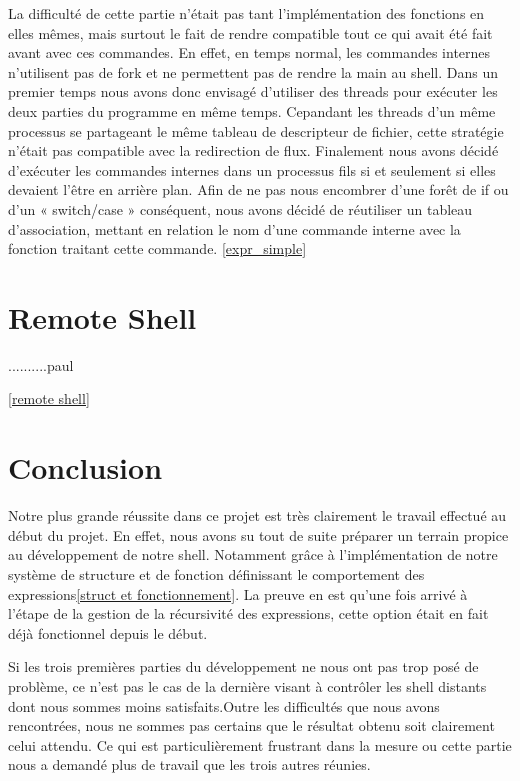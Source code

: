 \documentclass[12pt]{article}
\begin{document}
 La difficulté de cette partie n'était pas tant l'implémentation des fonctions en elles mêmes,
 mais surtout le fait de rendre compatible tout ce qui avait été fait avant avec ces commandes.
 En effet, en temps normal, les commandes internes n'utilisent pas de fork et ne permettent pas
 de rendre la main au shell. Dans un premier temps nous avons donc envisagé d'utiliser des threads
 pour exécuter les deux parties du programme en même temps. Cepandant les threads d'un même processus
 se partageant le même tableau de descripteur de fichier, cette stratégie n'était pas compatible
 avec la redirection de flux. Finalement nous avons décidé d'exécuter les commandes internes dans
 un processus fils si et seulement si elles devaient l'être en arrière plan.
 Afin de ne pas nous encombrer d'une forêt de if ou d'un « switch/case » conséquent, nous avons
 décidé de réutiliser un tableau d'association, mettant en relation le nom d'une commande interne
 avec la fonction traitant cette commande.  \ref{expr_simple}
 

\newpage
\section{Remote Shell}

..........paul


\ref{remote shell}





\newpage
\section{Conclusion}

Notre plus grande réussite dans ce projet est très clairement le travail effectué au
début du projet. En effet, nous avons su tout de suite préparer un terrain propice au
développement de notre shell. Notamment grâce à l'implémentation de notre système de structure et 
de fonction définissant le comportement des expressions\ref{struct et fonctionnement}.
La preuve en est qu'une fois arrivé à l'étape de la gestion de la récursivité des expressions, 
cette option était en fait déjà fonctionnel depuis le début.\newline

Si les trois premières parties du développement ne nous ont pas trop posé de problème, ce n'est pas le cas de la dernière visant à contrôler les shell distants dont nous sommes moins satisfaits.Outre les difficultés que nous avons rencontrées, nous ne sommes pas certains que le résultat obtenu soit clairement celui attendu. Ce qui est particulièrement frustrant dans la mesure ou cette partie nous a demandé plus de travail que les trois autres réunies.\newline
\end{document}
